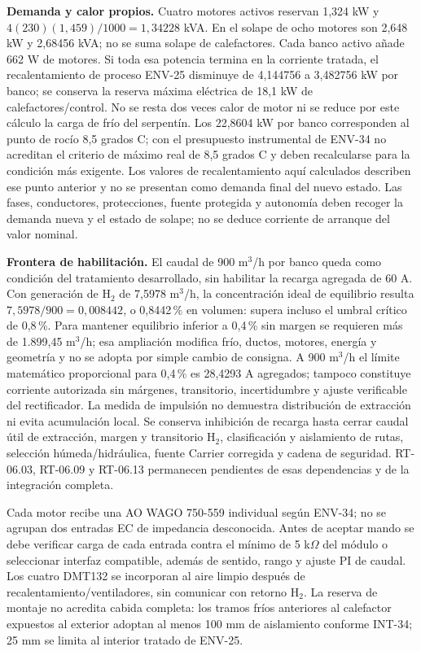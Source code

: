 \textbf{Demanda y calor propios.} Cuatro motores activos reservan 1,324 kW y $4(230)(1,459)/1000=1,34228$ kVA. En el solape de ocho motores son 2,648 kW y 2,68456 kVA; no se suma solape de calefactores. Cada banco activo añade 662 W de motores. Si toda esa potencia termina en la corriente tratada, el recalentamiento de proceso ENV-25 disminuye de 4,144756 a 3,482756 kW por banco; se conserva la reserva máxima eléctrica de 18,1 kW de calefactores/control. No se resta dos veces calor de motor ni se reduce por este cálculo la carga de frío del serpentín. Los 22,8604 kW por banco corresponden al punto de rocío 8,5 grados C; con el presupuesto instrumental de ENV-34 no acreditan el criterio de máximo real de 8,5 grados C y deben recalcularse para la condición más exigente. Los valores de recalentamiento aquí calculados describen ese punto anterior y no se presentan como demanda final del nuevo estado. Las fases, conductores, protecciones, fuente protegida y autonomía deben recoger la demanda nueva y el estado de solape; no se deduce corriente de arranque del valor nominal.

\textbf{Frontera de habilitación.} El caudal de 900 m$^3$/h por banco queda como condición del tratamiento desarrollado, sin habilitar la recarga agregada de 60 A. Con generación de H$_2$ de 7,5978 m$^3$/h, la concentración ideal de equilibrio resulta $7,5978/900=0,008442$, o 0,8442\,\% en volumen: supera incluso el umbral crítico de 0,8\,\%. Para mantener equilibrio inferior a 0,4\,\% sin margen se requieren más de 1.899,45 m$^3$/h; esa ampliación modifica frío, ductos, motores, energía y geometría y no se adopta por simple cambio de consigna. A 900 m$^3$/h el límite matemático proporcional para 0,4\,\% es 28,4293 A agregados; tampoco constituye corriente autorizada sin márgenes, transitorio, incertidumbre y ajuste verificable del rectificador. La medida de impulsión no demuestra distribución de extracción ni evita acumulación local. Se conserva inhibición de recarga hasta cerrar caudal útil de extracción, margen y transitorio H$_2$, clasificación y aislamiento de rutas, selección húmeda/hidráulica, fuente Carrier corregida y cadena de seguridad. RT-06.03, RT-06.09 y RT-06.13 permanecen pendientes de esas dependencias y de la integración completa.

Cada motor recibe una AO WAGO 750-559 individual según ENV-34; no se agrupan dos entradas EC de impedancia desconocida. Antes de aceptar mando se debe verificar carga de cada entrada contra el mínimo de 5 k$\Omega$ del módulo o seleccionar interfaz compatible, además de sentido, rango y ajuste PI de caudal. Los cuatro DMT132 se incorporan al aire limpio después de recalentamiento/ventiladores, sin comunicar con retorno H$_2$. La reserva de montaje no acredita cabida completa: los tramos fríos anteriores al calefactor expuestos al exterior adoptan al menos 100 mm de aislamiento conforme INT-34; 25 mm se limita al interior tratado de ENV-25.
